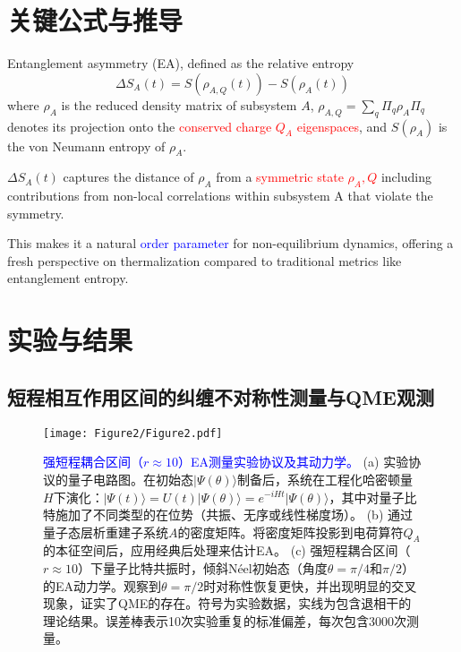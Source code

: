 \documentclass[11pt,a4paper]{article}
\begin{document}
\section{关键公式与推导}
Entanglement asymmetry (EA), defined as the relative entropy
\begin{equation}
\Delta S_A(t)=S\left(\rho_{A, Q}(t)\right)-S\left(\rho_A(t)\right)
\end{equation}
where $\rho_A$ is the reduced density matrix of subsystem $A$, $\rho_{A, Q}=\sum_q \Pi_q \rho_A \Pi_q$ denotes its projection onto the \textcolor{red}{conserved charge $Q_A$ eigenspaces}, and $S\left(\rho_A\right)$ is the von Neumann entropy of $\rho_A$. 

$\Delta S_A(t)$ captures the distance of $\rho_A$ from a \textcolor{red}{symmetric state $\rho_A,Q$} including contributions from non-local correlations within subsystem A that violate the symmetry.

This makes it a natural \textcolor{blue}{order parameter} for non-equilibrium dynamics, offering a fresh perspective on thermalization compared to traditional metrics like entanglement entropy.


\section{实验与结果}

\subsection{短程相互作用区间的纠缠不对称性测量与QME观测}

\begin{figure}[H]
    \centering
    \texttt{[image: Figure2/Figure2.pdf]}
    \caption{
        \textcolor{blue}{强短程耦合区间（$r\approx 10$）EA测量实验协议及其动力学。}
        (a) 实验协议的量子电路图。在初始态$|\Psi(\theta)\rangle$制备后，系统在工程化哈密顿量$H$下演化：$|\Psi(t)\rangle = U(t)|\Psi(\theta)\rangle = e^{-iHt}|\Psi(\theta)\rangle$，其中对量子比特施加了不同类型的在位势（共振、无序或线性梯度场）。
        (b) 通过量子态层析重建子系统$A$的密度矩阵。将密度矩阵投影到电荷算符$Q_A$的本征空间后，应用经典后处理来估计EA。
        (c) 强短程耦合区间（$r\approx 10$）下量子比特共振时，倾斜Néel初始态（角度$\theta=\pi/4$和$\pi/2$）的EA动力学。观察到$\theta=\pi/2$时对称性恢复更快，并出现明显的交叉现象，证实了QME的存在。符号为实验数据，实线为包含退相干的理论结果。误差棒表示10次实验重复的标准偏差，每次包含3000次测量。
    }
    \label{fig:EA_measurement_strong_coupling}
\end{figure}
\end{document}
